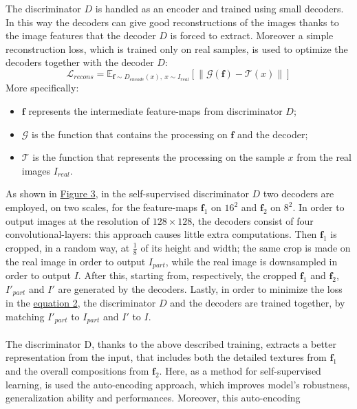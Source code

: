 \documentclass[12pt]{article}
\begin{document}
The discriminator $D$ is handled as an encoder and trained using small decoders. In this way the decoders can give good reconstructions
of the images thanks to the image features that the decoder $D$ is forced to extract. Moreover a simple reconstruction loss, which is 
trained only on real samples, is used to optimize the decoders together with the decoder $D$:
\begin{equation}
	\label{eq:eq2}
	\mathcal{L}_{recons} = \mathbb{E}_{\mathbf{f} \sim D_{encode}(x),\ x \sim I_{real}}[\parallel \mathcal{G}(\mathbf{f}) - \mathcal{T}(x) \parallel]
\end{equation}
More specifically:
\begin{itemize}
	\setlength\itemsep{0.01em}
	\item {	
		$\mathbf{f}$ represents the intermediate feature-maps from discriminator $D$;
	}
	\item {
		$\mathcal{G}$ is the function that contains the processing on $\mathbf{f}$ and the decoder;
	}
	\item {
		$\mathcal{T}$ is the function that represents the processing on the sample $x$ from the real images $I_{real}$.
	}
\end{itemize} 
As shown in \hyperref[fig:fig3]{Figure 3}, in the self-supervised discriminator $D$ two decoders are employed, on two scales, for the
feature-maps $\mathbf{f}_1$ on $16^2$ and $\mathbf{f}_2$ on $8^2$. In order to output images at the resolution of $128 \times 128$,
the decoders consist of four convolutional-layers: this approach causes little extra computations.
Then $\mathbf{f}_1$ is cropped, in a random way, at $\frac{1}{8}$ of its height and width; the same crop is made on the real image
in order to output $I_{part}$, while the real image is downsampled in order to output $I$.
After this, starting from, respectively, the cropped $\mathbf{f}_1$ and $\mathbf{f}_2$, $I'_{part}$ and $I'$ are generated by the decoders.
Lastly, in order to minimize the loss in the \hyperref[eq:eq2]{equation 2}, the discriminator $D$ and the decoders are trained together, by
matching $I'_{part}$ to $I_{part}$ and $I'$ to $I$.\\\\
The discriminator D, thanks to the above described training, extracts a better representation from the input, that includes both the detailed
textures from $\mathbf{f}_1$ and the overall compositions from $\mathbf{f}_2$. Here, as a method for self-supervised learning, is used the 
auto-encoding approach, which improves model's robustness, generalization ability and performances. Moreover, this auto-encoding
\end{document}
